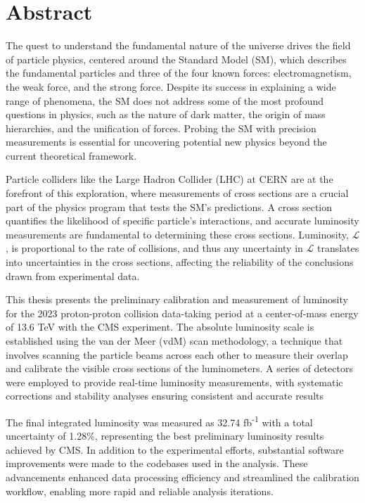 \chapter*{Abstract}

The quest to understand the fundamental nature of the universe drives the field of particle physics, centered around the Standard Model (SM), which describes the fundamental particles and three of the four known forces: electromagnetism, the weak force, and the strong force. Despite its success in explaining a wide range of phenomena, the SM does not address some of the most profound questions in physics, such as the nature of dark matter, the origin of mass hierarchies, and the unification of forces. Probing the SM with precision measurements is essential for uncovering potential new physics beyond the current theoretical framework.

Particle colliders like the Large Hadron Collider (LHC) at CERN are at the forefront of this exploration, where measurements of cross sections are a crucial part of the physics program that tests the SM’s predictions. A cross section quantifies the likelihood of specific particle's interactions, and accurate luminosity measurements are fundamental to determining these cross sections. Luminosity, \(\mathcal{L}\), is proportional to the rate of collisions, and thus any uncertainty in \(\mathcal{L}\) translates into uncertainties in the cross sections, affecting the reliability of the conclusions drawn from experimental data.

This thesis presents the preliminary calibration and measurement of luminosity for the 2023 proton-proton collision data-taking period at a center-of-mass energy of 13.6 TeV with the CMS experiment. The absolute luminosity scale is established using the van der Meer (vdM) scan methodology, a technique that involves scanning the particle beams across each other to measure their overlap and calibrate the visible cross sections of the luminometers. A series of detectors were employed to provide real-time luminosity measurements, with systematic corrections and stability analyses ensuring consistent and accurate results

The final integrated luminosity was measured as 32.74 fb\textsuperscript{-1} with a total uncertainty of 1.28\%, representing the best preliminary luminosity results achieved by CMS. In addition to the experimental efforts, substantial software improvements were made to the codebases used in the analysis. These advancements enhanced data processing efficiency and streamlined the calibration workflow, enabling more rapid and reliable analysis iterations.

